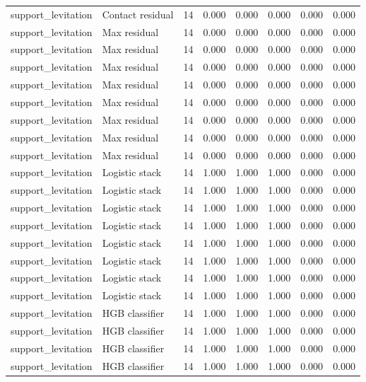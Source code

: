 {\begin{longtable}{llrrrrrr}
support\_levitation & Contact residual & 14 & 0.000 & 0.000 & 0.000 & 0.000 & 0.000 \\
support\_levitation & Max residual & 14 & 0.000 & 0.000 & 0.000 & 0.000 & 0.000 \\
support\_levitation & Max residual & 14 & 0.000 & 0.000 & 0.000 & 0.000 & 0.000 \\
support\_levitation & Max residual & 14 & 0.000 & 0.000 & 0.000 & 0.000 & 0.000 \\
support\_levitation & Max residual & 14 & 0.000 & 0.000 & 0.000 & 0.000 & 0.000 \\
support\_levitation & Max residual & 14 & 0.000 & 0.000 & 0.000 & 0.000 & 0.000 \\
support\_levitation & Max residual & 14 & 0.000 & 0.000 & 0.000 & 0.000 & 0.000 \\
support\_levitation & Max residual & 14 & 0.000 & 0.000 & 0.000 & 0.000 & 0.000 \\
support\_levitation & Max residual & 14 & 0.000 & 0.000 & 0.000 & 0.000 & 0.000 \\
support\_levitation & Logistic stack & 14 & 1.000 & 1.000 & 1.000 & 0.000 & 0.000 \\
support\_levitation & Logistic stack & 14 & 1.000 & 1.000 & 1.000 & 0.000 & 0.000 \\
support\_levitation & Logistic stack & 14 & 1.000 & 1.000 & 1.000 & 0.000 & 0.000 \\
support\_levitation & Logistic stack & 14 & 1.000 & 1.000 & 1.000 & 0.000 & 0.000 \\
support\_levitation & Logistic stack & 14 & 1.000 & 1.000 & 1.000 & 0.000 & 0.000 \\
support\_levitation & Logistic stack & 14 & 1.000 & 1.000 & 1.000 & 0.000 & 0.000 \\
support\_levitation & Logistic stack & 14 & 1.000 & 1.000 & 1.000 & 0.000 & 0.000 \\
support\_levitation & Logistic stack & 14 & 1.000 & 1.000 & 1.000 & 0.000 & 0.000 \\
support\_levitation & HGB classifier & 14 & 1.000 & 1.000 & 1.000 & 0.000 & 0.000 \\
support\_levitation & HGB classifier & 14 & 1.000 & 1.000 & 1.000 & 0.000 & 0.000 \\
support\_levitation & HGB classifier & 14 & 1.000 & 1.000 & 1.000 & 0.000 & 0.000 \\
support\_levitation & HGB classifier & 14 & 1.000 & 1.000 & 1.000 & 0.000 & 0.000 \\

\end{longtable}}
